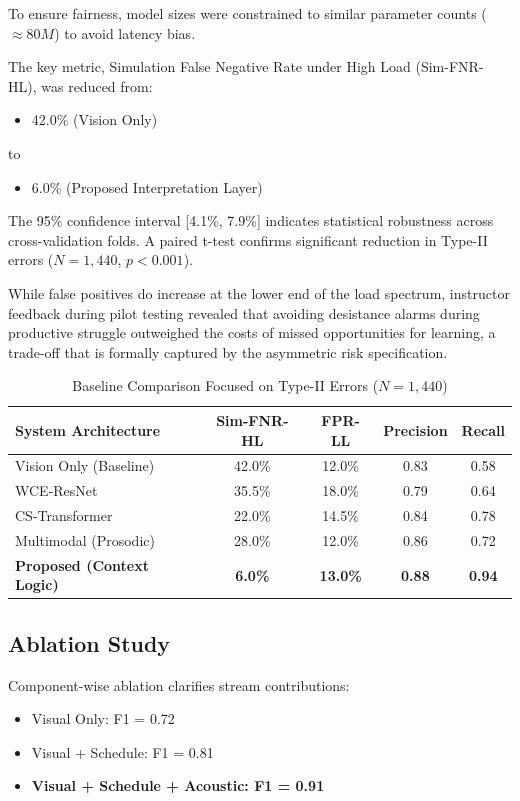 \documentclass[conference]{IEEEtran}
\begin{document}
To ensure fairness, model sizes were constrained to similar parameter counts ($\approx 80M$) to avoid latency bias.

The key metric, Simulation False Negative Rate under High Load (Sim-FNR-HL), was reduced from:
\begin{itemize}
    \item 42.0\% (Vision Only)
\end{itemize}
to
\begin{itemize}
    \item 6.0\% (Proposed Interpretation Layer)
\end{itemize}

The 95\% confidence interval [4.1\%, 7.9\%] indicates statistical robustness across cross-validation folds. A paired t-test confirms significant reduction in Type-II errors ($N = 1,440$, $p < 0.001$).

While false positives do increase at the lower end of the load spectrum, instructor feedback during pilot testing revealed that avoiding desistance alarms during productive struggle outweighed the costs of missed opportunities for learning, a trade-off that is formally captured by the asymmetric risk specification.

\begin{table}[htbp]
\caption{Baseline Comparison Focused on Type-II Errors ($N=1,440$)}
\begin{center}
\begin{tabular}{lcccc}
\toprule
\textbf{System Architecture} & \textbf{Sim-FNR-HL} & \textbf{FPR-LL} & \textbf{Precision} & \textbf{Recall} \\
\midrule
Vision Only (Baseline) & 42.0\% & 12.0\% & 0.83 & 0.58 \\
WCE-ResNet & 35.5\% & 18.0\% & 0.79 & 0.64 \\
CS-Transformer & 22.0\% & 14.5\% & 0.84 & 0.78 \\
Multimodal (Prosodic) & 28.0\% & 12.0\% & 0.86 & 0.72 \\
\textbf{Proposed (Context Logic)} & \textbf{6.0\%} & \textbf{13.0\%} & \textbf{0.88} & \textbf{0.94} \\
\bottomrule
\end{tabular}
\end{center}
\end{table}

\subsection{Ablation Study}
Component-wise ablation clarifies stream contributions:
\begin{itemize}
    \item Visual Only: F1 = 0.72
    \item Visual + Schedule: F1 = 0.81
    \item \textbf{Visual + Schedule + Acoustic: F1 = 0.91}
\end{itemize}
\end{document}
